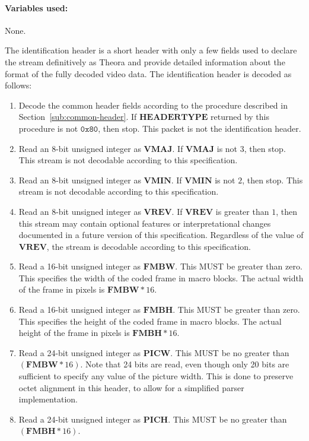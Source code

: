 \documentclass[9pt,letterpaper]{book}
\newcommand{\bitvar}[1]{\ensuremath{\mathbf{\bm{#1}}}}
\newcommand{\hex}[1]{\ensuremath{\mathtt{0x#1}}}
\numberwithin{equation}{chapter}
\numberwithin{figure}{chapter}
\numberwithin{table}{chapter}
\begin{document}
\paragraph{Variables used:} None.
\medskip

The identification header is a short header with only a few fields used to
 declare the stream definitively as Theora and provide detailed information
 about the format of the fully decoded video data.
The identification header is decoded as follows:

\begin{enumerate}
\item
Decode the common header fields according to the procedure described in
 Section~\ref{sub:common-header}.
If \bitvar{HEADERTYPE} returned by this procedure is not \hex{80}, then stop.
This packet is not the identification header.
\item
Read an 8-bit unsigned integer as \bitvar{VMAJ}.
If \bitvar{VMAJ} is not $3$, then stop.
This stream is not decodable according to this specification.
\item
Read an 8-bit unsigned integer as \bitvar{VMIN}.
If \bitvar{VMIN} is not $2$, then stop.
This stream is not decodable according to this specification.
\item
Read an 8-bit unsigned integer as \bitvar{VREV}.
If \bitvar{VREV} is greater than $1$, then this stream
may contain optional features or interpretational changes 
documented in a future version of this specification.
Regardless of the value of \bitvar{VREV}, the stream is decodable 
according to this specification.
\item
Read a 16-bit unsigned integer as \bitvar{FMBW}.
This MUST be greater than zero.
This specifies the width of the coded frame in macro blocks.
The actual width of the frame in pixels is $\bitvar{FMBW}*16$.
\item
Read a 16-bit unsigned integer as \bitvar{FMBH}.
This MUST be greater than zero.
This specifies the height of the coded frame in macro blocks.
The actual height of the frame in pixels is $\bitvar{FMBH}*16$.
\item
Read a 24-bit unsigned integer as \bitvar{PICW}.
This MUST be no greater than $(\bitvar{FMBW}*16)$.
Note that 24 bits are read, even though only 20 bits are sufficient to specify
 any value of the picture width.
This is done to preserve octet alignment in this header, to allow for a
 simplified parser implementation.
\item
Read a 24-bit unsigned integer as \bitvar{PICH}.
This MUST be no greater than $(\bitvar{FMBH}*16)$.

\end{enumerate}
\end{document}
